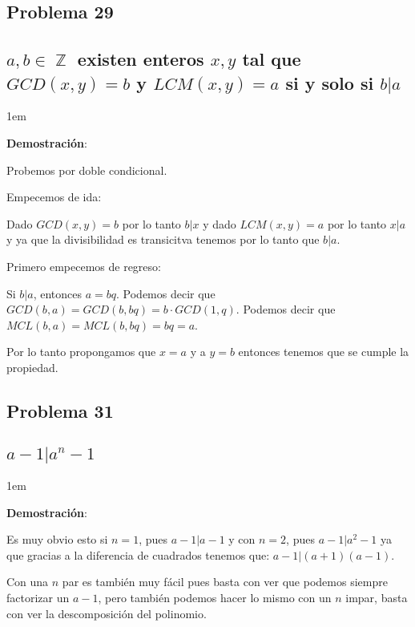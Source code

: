 \documentclass[12pt, fleqn]{article}                             %
\newenvironment{SmallIndentation}[1][0.75em]                    %
    {\begin{adjustwidth}{#1}{}\begin{footnotesize}}                 %
    {\end{footnotesize}\end{adjustwidth}}                           %
\DeclareMathOperator \Integers  {\mathbb{Z}}                     %
\begin{document}
    \subsection{Problema 29}
    \subsection*{$a, b \in \Integers$ existen enteros $x, y$ tal que
        $GCD(x, y) = b$  y $LCM(x, y) = a$ si y solo si $b|a$}

        \begin{SmallIndentation}[1em]
            \textbf{Demostración}:

            Probemos por doble condicional.

            Empecemos de ida:
            
            Dado $GCD(x, y) = b$ por lo tanto $b|x$ y dado $LCM(x, y) = a$ por lo tanto $x|a$
            y ya que la divisibilidad es transicitva tenemos por lo tanto que $b|a$.


            Primero empecemos de regreso:

            Si $b|a$, entonces $a = bq$.
            Podemos decir que $GCD(b, a) = GCD(b, bq) = b \cdot GCD(1, q)$.
            Podemos decir que $MCL(b, a) = MCL(b, bq) = bq = a$.

            Por lo tanto propongamos que $x=a$ y a $y=b$ entonces tenemos que 
            se cumple la propiedad.

        \end{SmallIndentation}


    \subsection{Problema 31}
    \subsection*{$a - 1 |a^n -1$}

        \begin{SmallIndentation}[1em]
            \textbf{Demostración}:

            Es muy obvio esto si $n=1$, pues $a-1|a-1$ y con $n=2$, pues $a-1|a^2-1$
            ya que gracias a la diferencia de cuadrados tenemos que:
            $a-1|(a+1)(a-1)$.

            Con una $n$ par es también muy fácil pues basta con ver que podemos siempre
            factorizar un $a-1$, pero también podemos hacer lo mismo con un $n$ impar, 
            basta con ver la descomposición del polinomio.

        \end{SmallIndentation}
\end{document}
